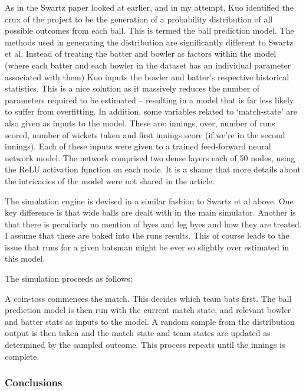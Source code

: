 As in the Swartz paper looked at earlier, and in my attempt, Kuo identified the crux of the project to be the generation of a probability distribution of all possible outcomes from each ball. This is termed the ball prediction model. The methods used in generating the distribution are significantly different to Swartz et al. Instead of treating the batter and bowler as factors within the model (where each batter and each bowler in the dataset has an individual parameter associated with them) Kuo inputs the bowler and batter’s respective historical statistics. This is a nice solution as it massively reduces the number of parameters required to be estimated – resulting in a model that is far less likely to suffer from overfitting. \cite{everitt_cambridge_2010} In addition, some variables related to ‘match-state’ are also given as inputs to the model. These are: innings, over, number of runs scored, number of wickets taken and first innings score (if we’re in the second innings). Each of these inputs were given to a trained feed-forward neural network model. The network comprised two dense layers each of 50 nodes, using the ReLU activation function on each node. It is a shame that more details about the intricacies of the model were not shared in the article.

The simulation engine is devised in a similar fashion to Swartz et al above. One key difference is that wide balls are dealt with in the main simulator. Another is that there is peculiarly no mention of byes and leg byes and how they are treated. I assume that these are baked into the runs results. This of course leads to the issue that runs for a given batsman might be ever so slightly over estimated in this model.\footnotemark{}


The simulation proceeds as follows:

A coin-toss commences the match. This decides which team bats first. The ball prediction model is then run with the current match state, and relevant bowler and batter stats as inputs to the model. A random sample from the distribution output is then taken and the match state and team states are updated as determined by the sampled outcome. This process repeats until the innings is complete.

\subsubsection{Conclusions}

